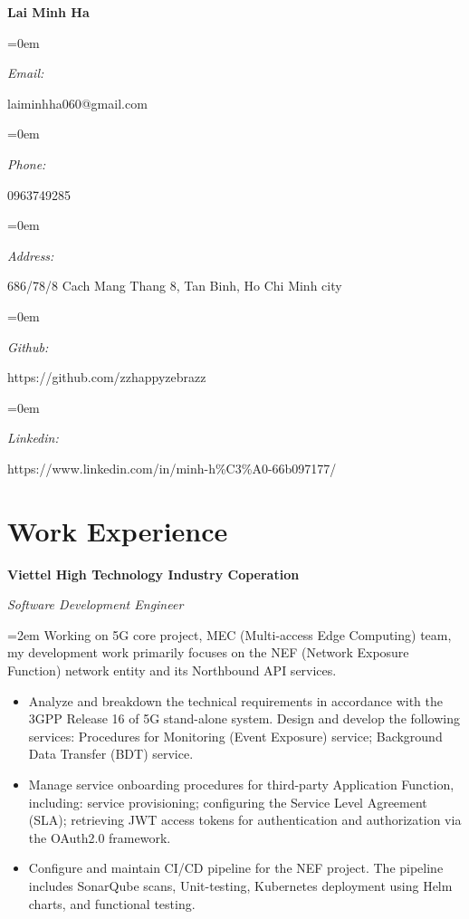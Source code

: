 \documentclass[10pt]{article}
\newlength{\spacebox}
\newcommand{\name}[1]{
\Huge %
\fontfamily{phv}\selectfont %
\begin{center} \textbf{#1} \end{center}\par
\normalsize\normalfont}
\newcommand{\motto}[1]{
  \large %
  \fontfamily{phv}\selectfont %
  \begin{center} \textsl{#1}\end{center}\par
  \normalsize \normalfont}
\newcommand{\info}[2]{
  \noindent\hangindent=0em\hangafter=0
  \parbox{\spacebox}{%
  \textit{#1}} %
  #2 \par} %
\newcommand{\work}[4]{
  \noindent  \textbf{#1}
  \hfill 
\framebox{%
  \parbox{9em}{%
  \centering\textbf{#2}}} \par
  \noindent \textit{#3} \par
  \vspace*{0.5em}
  \noindent\hangindent=2em\hangafter=0 \small #4 
\normalsize \par}
\begin{document}
\name{Lai Minh Ha}
\vspace*{-13pt}
\motto{}

\info{Email:}{laiminhha060@gmail.com}
\info{Phone:}{0963749285}
\info{Address:}{686/78/8 Cach Mang Thang 8, Tan Binh, Ho Chi Minh city}
\info{Github:}{https://github.com/zzhappyzebrazz}
\info{Linkedin:}{https://www.linkedin.com/in/minh-h\%C3\%A0-66b097177/}

\section*{Work Experience}
\work{Viettel High Technology Industry Coperation}
{May 2023--Now}
{Software Development Engineer}
{Working on 5G core project, MEC (Multi-access Edge Computing) team, my development work primarily focuses on the NEF (Network Exposure Function) network entity and its Northbound API services.

\begin{itemize}
    \item Analyze and breakdown the technical requirements in accordance with the 3GPP Release 16 of 5G stand-alone system.
     Design and develop the following services: Procedures for Monitoring (Event Exposure) service; %
     Background Data Transfer (BDT) service.
    \item Manage service onboarding procedures for third-party Application Function, including: service provisioning; configuring the Service Level Agreement (SLA); retrieving JWT access tokens for authentication and authorization via the OAuth2.0 framework.
    \item Configure and maintain CI/CD pipeline for the NEF project. The pipeline includes SonarQube scans, Unit-testing, Kubernetes deployment using Helm charts, and functional testing.
\end{itemize}}
\end{document}
